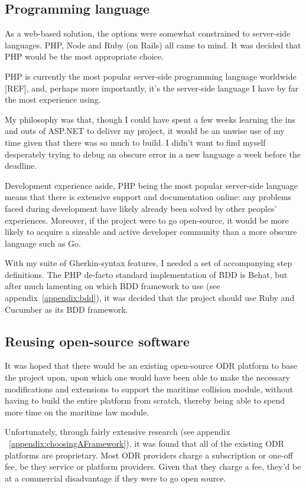 \subsection{Programming language}

As a web-based solution, the options were somewhat constrained to server-side languages. PHP, Node and Ruby (on Rails) all came to mind. It was decided that PHP would be the most appropriate choice.

PHP is currently the most popular server-side programming language worldwide [REF], and, perhaps more importantly, it's the server-side language I have by far the most experience using. %

My philosophy was that, though I could have spent a few weeks learning the ins and outs of ASP.NET to deliver my project, it would be an unwise use of my time given that there was so much to build. I didn't want to find myself desperately trying to debug an obscure error in a new language a week before the deadline. 

Development experience aside, PHP being the most popular server-side language means that there is extensive support and documentation online: any problems faced during development have likely already been solved by other peoples' experiences. Moreover, if the project were to go open-source, it would be more likely to acquire a sizeable and active developer community than a more obscure language such as Go.

With my suite of Gherkin-syntax features, I needed a set of accompanying step definitions. The PHP de-facto standard implementation of BDD is Behat,  but after much lamenting on which BDD framework to use (see appendix~\ref{appendix:bdd}), it was decided that the project should use Ruby and Cucumber as its BDD framework.

\subsection{Reusing open-source software}

It was hoped that there would be an existing open-source ODR platform to base the project upon, upon which one would have been able to make the necessary modifications and extensions to support the maritime collision module, without having to build the entire platform from scratch, thereby being able to spend more time on the maritime law module.

Unfortunately, through fairly extensive research (see appendix ~\ref{appendix:choosingAFramework}), it was found that all of the existing ODR platforms are proprietary. Most ODR providers charge a subscription or one-off fee, be they service or platform providers. Given that they charge a fee, they'd be at a commercial disadvantage if they were to go open source.

